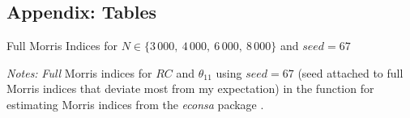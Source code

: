 


\subsection*{Appendix: Tables} \label{appendix_a}
\appendix

\begin{table}[H]
    \centering
    \caption{Full Morris Indices for $N \in \{3\,000,\ 4\,000,\ 6\,000,\ 8\,000\}$ and $seed=67$}
    \label{appendix_morris_seed_67}
    \begin{threeparttable}
    \begin{centering}
        
        \begin{tablenotes}
            \small
            \item \textit{Notes:} \textit{Full} Morris indices for $RC$ and $\theta_{11}$ using $seed=67$ (seed attached to full Morris indices that deviate most from my expectation) in the function for estimating Morris indices from the \textit{econsa} package \citep{OSE21}.
        \end{tablenotes}
    \end{centering}

    \end{threeparttable}

\end{table}